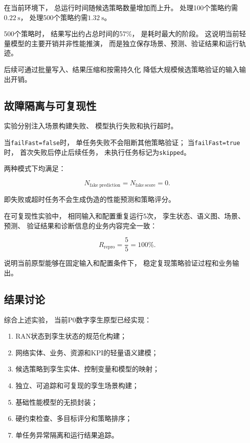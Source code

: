 \documentclass[lang=cn,12pt]{elegantbook}
\begin{document}
在当前环境下，
总运行时间随候选策略数量增加而上升。
处理100个策略约需$0.22~\mathrm{s}$，
处理500个策略约需$1.32~\mathrm{s}$。

500个策略时，
结果写出约占总时间的57\%，
是耗时最大的阶段。
这说明当前轻量模型的主要开销并非性能推演，
而是独立保存场景、预测、验证结果和运行轨迹。

后续可通过批量写入、结果压缩和按需持久化
降低大规模候选策略验证的输入输出开销。


\subsection*{故障隔离与可复现性}

实验分别注入场景构建失败、
模型执行失败和执行超时。

当\texttt{failFast=false}时，
单任务失败不会阻断其他策略验证；
当\texttt{failFast=true}时，
首次失败后停止后续任务，
未执行任务标记为\texttt{skipped}。

两种模式下均满足：

\begin{equation}
N_{\mathrm{fake\ prediction}}
=
N_{\mathrm{fake\ score}}
=
0.
\end{equation}

即失败或超时任务不会生成伪造的性能预测和策略评分。

在可复现性实验中，
相同输入和配置重复运行5次，
孪生状态、语义图、场景、预测、
验证结果和诊断信息的业务内容完全一致：

\begin{equation}
R_{\mathrm{repro}}
=
\frac{5}{5}
=
100\%.
\end{equation}

说明当前原型能够在固定输入和配置条件下，
稳定复现策略验证过程和业务输出。


\subsection*{结果讨论}

综合上述实验，
当前P0数字孪生原型已经实现：

\begin{enumerate}[label=\arabic*)]
    \item RAN状态到孪生状态的规范化构建；
    \item 网络实体、业务、资源和KPI的轻量语义建模；
    \item 候选策略到孪生实体、控制变量和模型的映射；
    \item 独立、可追踪和可复现的孪生场景构建；
    \item 基础性能模型的无损封装；
    \item 硬约束检查、多目标评分和策略排序；
    \item 单任务异常隔离和运行结果追踪。
\end{enumerate}
\end{document}
